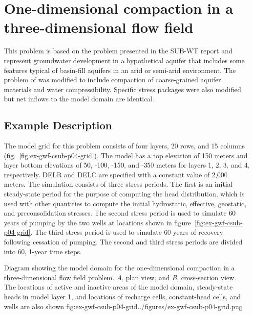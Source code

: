 \section{One-dimensional compaction in a three-dimensional flow field}

This problem is based on the problem presented in the SUB-WT report \citep{leake2007modflow} and represent groundwater development in a hypothetical aquifer that includes some features typical of basin-fill aquifers in an arid or semi-arid environment. The problem of \cite{leake2007modflow} was modified to include compaction of coarse-grained aquifer materials and water compressibility. Specific stress packages were also modified but net inflows to the model domain are identical.

\subsection{Example Description}

The model grid for this problem consists of four layers, 20 rows, and 15 columns (fig.~\ref{fig:ex-gwf-csub-p04-grid}).  The model has a top elevation of 150 meters and layer bottom elevations of 50, -100, -150, and -350 meters for layers 1, 2, 3, and 4, respectively.  DELR and DELC are specified with a constant value of 2,000 meters. The simulation consists of three stress periods. The first is an initial steady-state period for the purpose of computing the head distribution, which is used with other quantities to compute the initial hydrostatic, effective, geostatic, and preconsolidation stresses. The second stress period is used to simulate 60 years of pumping by the two wells at locations shown in figure~\ref{fig:ex-gwf-csub-p04-grid}. The third stress period is used to simulate 60 years of recovery following cessation of pumping. The second and third stress periods are divided into 60, 1-year time steps.

\begin{StandardFigure}{
                                     Diagram showing the model domain for the one-dimensional compaction in a 
                                     three-dimensional flow field problem. \textit{A}, plan view, and \textit{B}, cross-section 
                                     view. The locations of active and inactive areas of the model domain, steady-state 
                                     heads in model layer 1, and locations of recharge cells, constant-head cells, 
                                     and wells are also shown
                                     }{fig:ex-gwf-csub-p04-grid}{../figures/ex-gwf-csub-p04-grid.png}
\end{StandardFigure}                                 

